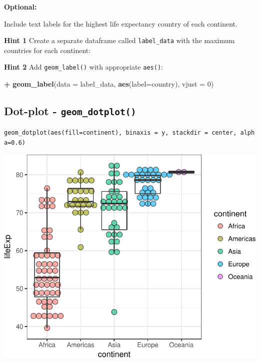 \documentclass[12pt,]{krantz}
\makeatletter
\newenvironment{Shaded}{\begin{snugshade}}{\end{snugshade}}
\newcommand{\CommentTok}[1]{\textcolor[rgb]{0.56,0.35,0.01}{\textit{#1}}}
\newcommand{\DataTypeTok}[1]{\textcolor[rgb]{0.13,0.29,0.53}{#1}}
\newcommand{\DecValTok}[1]{\textcolor[rgb]{0.00,0.00,0.81}{#1}}
\newcommand{\KeywordTok}[1]{\textcolor[rgb]{0.13,0.29,0.53}{\textbf{#1}}}
\newcommand{\NormalTok}[1]{#1}
\newcommand{\OperatorTok}[1]{\textcolor[rgb]{0.81,0.36,0.00}{\textbf{#1}}}
\newcommand{\StringTok}[1]{\textcolor[rgb]{0.31,0.60,0.02}{#1}}
\newenvironment{kframe}{%
\medskip{}
\setlength{\fboxsep}{.8em}
 \def\at@end@of@kframe{}%
 \ifinner\ifhmode%
  \def\at@end@of@kframe{\end{minipage}}%
  \begin{minipage}{\columnwidth}%
 \fi\fi%
 \def\FrameCommand##1{\hskip\@totalleftmargin \hskip-\fboxsep
 \colorbox{shadecolor}{##1}\hskip-\fboxsep
     \hskip-\linewidth \hskip-\@totalleftmargin \hskip\columnwidth}%
 \MakeFramed {\advance\hsize-\width
   \@totalleftmargin\z@ \linewidth\hsize
   \@setminipage}}%
 {\par\unskip\endMakeFramed%
 \at@end@of@kframe}
\renewenvironment{Shaded}{\begin{kframe}}{\end{kframe}}
\theoremstyle{definition}
\theoremstyle{definition}
\theoremstyle{definition}
\theoremstyle{remark}
\makeatother
\begin{document}
\textbf{Optional:}

Include text labels for the highest life expectancy country of each
continent.

\textbf{Hint 1} Create a separate dataframe called \texttt{label\_data}
with the maximum countries for each continent:

\begin{Shaded}
\end{Shaded}

\textbf{Hint 2} Add \texttt{geom\_label()} with appropriate
\texttt{aes()}:

\begin{Shaded}
\begin{Highlighting}[]
\OperatorTok{+}\StringTok{ }\KeywordTok{geom_label}\NormalTok{(}\DataTypeTok{data =}\NormalTok{ label_data, }\KeywordTok{aes}\NormalTok{(}\DataTypeTok{label=}\NormalTok{country), }\DataTypeTok{vjust =} \DecValTok{0}\NormalTok{)}
\end{Highlighting}
\end{Shaded}

\hypertarget{dot-plot---geom_dotplot}{%
\subsection{\texorpdfstring{Dot-plot -
\texttt{geom\_dotplot()}}{Dot-plot - geom\_dotplot()}}\label{dot-plot---geom_dotplot}}

\texttt{geom\_dotplot(aes(fill=continent),\ binaxis\ =\ \textquotesingle{}y\textquotesingle{},\ stackdir\ =\ \textquotesingle{}center\textquotesingle{},\ alpha=0.6)}

\includegraphics{04_plotting_files/figure-latex/unnamed-chunk-13-1.pdf}
\end{document}
